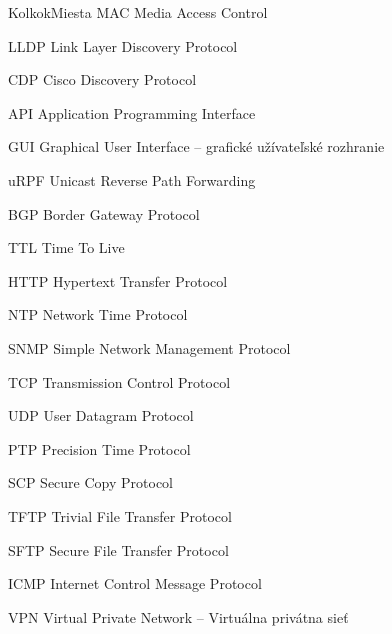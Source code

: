 \begin{seznamzkratek}{KolkokMiesta}
	{MAC} %
	{Media Access Control} %
	
	{LLDP} %
	{Link Layer Discovery Protocol} %
	
	{CDP} %
	{Cisco Discovery Protocol} %

	{API} %
	{Application Programming Interface} %
	
	{GUI} %
	{Graphical User Interface -- grafické užívateľské rozhranie} %
	
	{uRPF} %
	{Unicast Reverse Path Forwarding} %
	
	{BGP} %
	{Border Gateway Protocol} %
	
	{TTL} %
	{Time To Live} %
	
	{HTTP} %
	{Hypertext Transfer Protocol} %
	
	{NTP} %
	{Network Time Protocol} %
	
	{SNMP} %
	{Simple Network Management Protocol} %
	
	{TCP} %
	{Transmission Control Protocol} %

	{UDP} %
	{User Datagram Protocol} %
	
	{PTP} %
	{Precision Time Protocol} %

	{SCP} %
	{Secure Copy Protocol} %
	
	{TFTP} %
	{Trivial File Transfer Protocol} %
	
	{SFTP} %
	{Secure File Transfer Protocol} %
	
	{ICMP} %
	{Internet Control Message Protocol} %
	
	{VPN} %
	{Virtual Private Network -- Virtuálna privátna sieť} %
	

\end{seznamzkratek}
